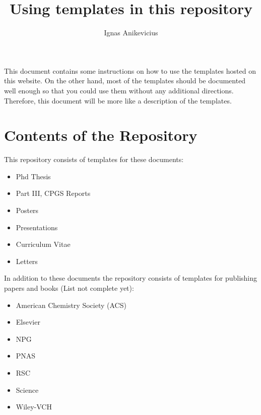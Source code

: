 


\title{Using templates in this repository}
\author{Ignas Anikevicius}



\maketitle

This document contains some instructions on how to use the templates hosted on
this website. 
%
On the other hand, most of the templates should be documented well enough so
that you could use them without any additional directions.
%
Therefore, this document will be more like a description of the templates.

\tableofcontents

\section{Contents of the Repository}

This repository consists of templates for these documents:
\begin{itemize}
    \item Phd Thesis
    \item Part III, CPGS Reports
    \item Posters
    \item Presentations
    \item Curriculum Vitae
    \item Letters
\end{itemize}

In addition to these documents the repository consists of templates for
publishing papers and books (List not complete yet):
\begin{itemize}
    \item American Chemistry Society (ACS)
    \item Elsevier
    \item NPG
    \item PNAS
    \item RSC
    \item Science
    \item Wiley-VCH
\end{itemize}

